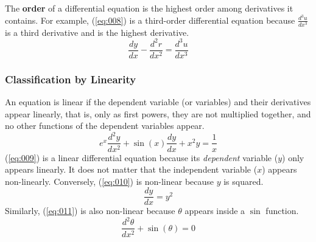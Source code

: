 \documentclass[12pt]{article}
\begin{document}
The \textbf{order} of a differential equation is the highest order among derivatives it contains. For example, (\ref{eq:008}) is a third-order differential equation because $\frac{d^3u}{dx^3}$ is a third derivative and is the highest derivative.
\begin{equation}
  \frac{dy}{dx} - \frac{d^2r}{dx^2} = \frac{d^3u}{dx^3}
  \label{eq:008}
\end{equation}

\subsubsection{Classification by Linearity}
\label{sssec:classificationByLinearity}

An equation is linear if the dependent variable (or variables) and their derivatives appear linearly, that is, only as first powers, they are not multiplied together, and no other functions of the dependent variables appear.
\begin{equation}
  e^x \frac{d^2y}{dx^2} + \sin(x) \frac{dy}{dx} + x^2y = \frac{1}{x}
  \label{eq:009}
\end{equation}
(\ref{eq:009}) is a linear differential equation because its \textit{dependent} variable ($y$) only appears linearly. It does not matter that the independent variable ($x$) appears non-linearly. Conversely, (\ref{eq:010}) is non-linear because $y$ is squared.
\begin{equation}
  \frac{dy}{dx} = y^2
  \label{eq:010}
\end{equation}
Similarly, (\ref{eq:011}) is also non-linear because $\theta$ appears inside a $\sin$ function.
\begin{equation}
  \frac{d^2\theta}{dx^2} + \sin(\theta) = 0
  \label{eq:011}
\end{equation}
\end{document}

